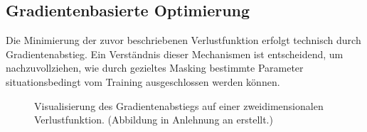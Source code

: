 \subsection{Gradientenbasierte Optimierung}
Die Minimierung der zuvor beschriebenen Verlustfunktion erfolgt technisch durch Gradientenabstieg. Ein Verständnis dieser Mechanismen ist entscheidend, um nachzuvollziehen, wie durch gezieltes Masking bestimmte Parameter situationsbedingt vom Training ausgeschlossen werden können.

\begin{figure}[htbp]
    \centering
    \caption[Gradientenabstieg Visualisierung]{Visualisierung des Gradientenabstiegs auf einer zweidimensionalen Verlustfunktion. (Abbildung in Anlehnung an \cite{gradientenabstieg_visio} erstellt.)}
    \label{fig:gradient_descent_3d}
\end{figure}


